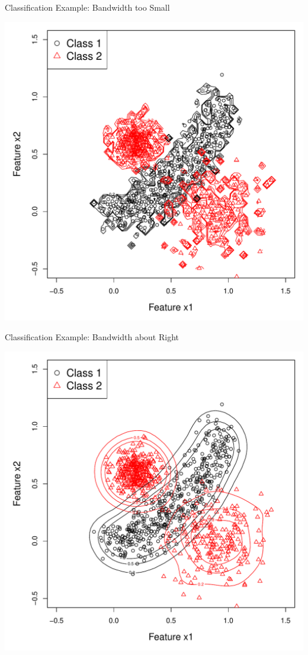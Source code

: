 \documentclass[12pt]{beamer}
\begin{document}
\begin{frame}{Classification Example: Bandwidth too Small}

  \begin{center}
    \includegraphics[scale=0.4]{figs/kde2d1.pdf}
  \end{center}
  
\end{frame}

\begin{frame}{Classification Example: Bandwidth about Right}

  \begin{center}
    \includegraphics[scale=0.4]{figs/kde2d2.pdf}
  \end{center}
  
\end{frame}
\end{document}
